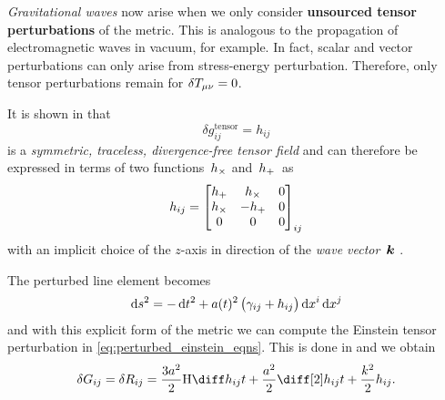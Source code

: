 \documentclass[12pt,parskip=half]{scrreprt}
\begin{document}
\emph{Gravitational waves} now arise when we only consider \textbf{unsourced tensor perturbations} of the metric. This is analogous to the propagation of electromagnetic waves in vacuum, for example.  In fact, scalar and vector perturbations can only arise from stress-energy perturbation.  Therefore, only tensor perturbations remain for \(\delta T_{\mu \nu}=0\).

It is shown in  that
\begin{equation}
	\delta g^{\mathrm{tensor}}_{ij} = h_{ij}
\end{equation}
is a \emph{symmetric, traceless, divergence-free tensor field} and can therefore be expressed in terms of two functions~\(h_\times\) and~\(h_+\)~as
\begin{equation}
	h_{ij} =
	\begin{bmatrix}
		h_+ & h_\times & 0 \\
		h_\times & -h_+ & 0 \\
		0 & 0 & 0
	\end{bmatrix}_{ij}
\end{equation}
with an implicit choice of the \(z\)-axis in direction of the \emph{wave vector}~\(\boldsymbol{k}\) \citep{Dodelson}. 

The perturbed line element becomes
\begin{equation}
	\dif{s}^2 = -\dif{t}^2 + a(t)^2 \del{\gamma_{ij} + h_{ij}} \dif{x^i}\dif{x^j}
\end{equation}
and with this explicit form of the metric we can compute the Einstein tensor perturbation in \eqref{eq:perturbed_einstein_eqns}. This is done in  and we obtain
\begin{align}\label{eq:evolution}
	\delta\Gtens_{ij} = \delta\Rtens_{ij} = \frac{3 a^2}{2} \Hcosm \dt{h_{ij}} + \frac{a^2}{2}\ddt{h_{ij}} + \frac{k^2}{2}h_{ij} \eqpunct{.}
\end{align}
\end{document}
